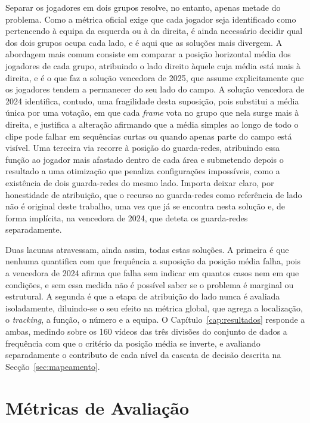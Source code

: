 Separar os jogadores em dois grupos resolve, no entanto, apenas metade do problema. Como a
métrica oficial exige que cada jogador seja identificado como pertencendo à equipa da
esquerda ou à da direita, é ainda necessário decidir qual dos dois grupos ocupa cada lado, e
é aqui que as soluções mais divergem. A abordagem mais comum consiste em comparar a posição
horizontal média dos jogadores de cada grupo, atribuindo o lado direito àquele cuja média
está mais à direita, e é o que faz a solução vencedora de 2025, que assume explicitamente
que os jogadores tendem a permanecer do seu lado do campo. A solução vencedora de 2024
identifica, contudo, uma fragilidade desta suposição, pois substitui a média única por uma
votação, em que cada \emph{frame} vota no grupo que nela surge mais à direita, e justifica a
alteração afirmando que a média simples ao longo de todo o clipe pode falhar em sequências
curtas ou quando apenas parte do campo está visível. Uma terceira via recorre à posição do
guarda-redes, atribuindo essa função ao jogador mais afastado dentro de cada área e
submetendo depois o resultado a uma otimização que penaliza configurações impossíveis, como
a existência de dois guarda-redes do mesmo lado. Importa deixar claro, por honestidade de
atribuição, que o recurso ao guarda-redes como referência de lado não é original deste
trabalho, uma vez que já se encontra nesta solução e, de forma implícita, na vencedora de
2024, que deteta os guarda-redes separadamente.

Duas lacunas atravessam, ainda assim, todas estas soluções. A primeira é que nenhuma
quantifica com que frequência a suposição da posição média falha, pois a vencedora de 2024
afirma que falha sem indicar em quantos casos nem em que condições, e sem essa medida não é
possível saber se o problema é marginal ou estrutural. A segunda é que a etapa de atribuição
do lado nunca é avaliada isoladamente, diluindo-se o seu efeito na métrica global, que agrega
a localização, o \emph{tracking}, a função, o número e a equipa. O Capítulo~\ref{cap:resultados}
responde a ambas, medindo sobre os 160 vídeos das três divisões do conjunto de dados a
frequência com que o critério da posição média se inverte, e avaliando separadamente o
contributo de cada nível da cascata de decisão descrita na Secção~\ref{sec:mapeamento}.

\section{Métricas de Avaliação}\label{sec:metricas}

